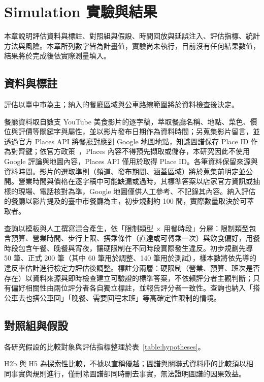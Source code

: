 \chapter{Simulation 實驗與結果}

本章說明評估資料與標註、對照組與假設、時間回放與延誤注入、評估指標、統計方法與風險。本章所列數字皆為計畫值，實驗尚未執行，目前沒有任何結果數值，結果將於完成後依實際測量填入。


\section{資料與標註}

評估以臺中市為主；納入的餐廳區域與公車路線範圍將於資料檢查後決定。

餐廳資料取自數支 YouTube 美食影片的逐字稿，萃取餐廳名稱、地點、菜色、價位與評價等關鍵字與屬性，並以影片發布日期作為資料時間；另蒐集影片留言，並透過官方 Places API 將餐廳對應到 Google 地圖地點，知識圖譜保存 Place ID 作為對齊鍵；依官方政策~\cite{google_places_policy}，Places 內容不得預先擷取或儲存，本研究因此不使用 Google 評論與地圖內容，Places API 僅用於取得 Place ID。各筆資料保留來源與資料時間。影片的選取準則（頻道、發布期間、涵蓋區域）將於蒐集前明定並公開。營業時間與價格在逐字稿中可能缺漏或過時，其標準答案以店家官方資訊或抽樣的現場、電話核對為準，Google 地圖僅供人工參考、不記錄其內容。納入評估的餐廳以影片提及的臺中市餐廳為主，初步規劃約 100 間，實際數量取決於可萃取者。


查詢以模板與人工撰寫混合產生，依「限制類型 × 用餐時段」分層：限制類型包含預算、營業時間、步行上限、搭乘條件（直達或可轉乘一次）與飲食偏好，用餐時段包含午餐、晚餐與宵夜，讓硬限制在不同時段實際發生違反。初步規劃先導 50 筆、正式 200 筆（其中 60 筆用於調整、140 筆用於測試），樣本數將依先導的違反率估計進行檢定力評估後調整。標註分兩層：硬限制（營業、預算、班次是否存在）以資料來源與即時檢查建立可驗證的標準答案，不依賴評分者主觀判斷；只有偏好相關性由兩位評分者各自獨立標註，並報告評分者一致性。查詢也納入「搭公車去也搭公車回」「晚餐、需要回程末班」等高確定性限制的情境。


\section{對照組與假設}

各研究假設的比較對象與評估指標整理於表~\ref{table:hypotheses}。



H2b 與 H5 為探索性比較，不據以宣稱優越；圖譜與關聯式資料庫的比較須以相同事實與規則進行，僅刪除圖譜卻同時刪去事實，無法證明圖譜的因果效益。


